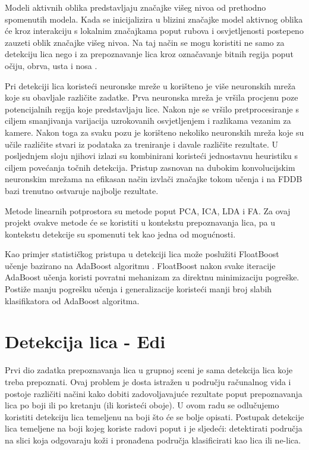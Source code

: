 \documentclass[times, utf8, seminar, numeric]{fer}
\begin{document}
Modeli aktivnih oblika predstavljaju značajke višeg nivoa od prethodno spomenutih modela. Kada se inicijalizira u blizini značajke model aktivnog oblika će kroz interakciju s lokalnim značajkama poput rubova i osvjetljenosti postepeno zauzeti oblik značajke višeg nivoa. Na taj način se mogu koristiti ne samo za detekciju lica nego i za prepoznavanje lica kroz označavanje bitnih regija poput očiju, obrva, usta i nosa \cite{prabhu_utsav_facialrecog}.

Pri detekciji lica koristeći neuronske mreže u \cite{Rowley98neuralnetwork-based} korišteno je više neuronskih mreža koje su obavljale različite zadatke. Prva neuronska mreža je vršila procjenu poze potencijalnih regija koje predstavljaju lice. Nakon nje se vršilo pretprocesiranje s ciljem smanjivanja varijacija uzrokovanih osvjetljenjem i razlikama vezanim za kamere. Nakon toga za svaku pozu je korišteno nekoliko neuronskih mreža koje su učile različite stvari iz podataka za treniranje i davale različite rezultate. U posljednjem sloju njihovi izlazi su kombinirani koristeći jednostavnu heuristiku s ciljem povećanja točnih detekcija. Pristup zasnovan na dubokim konvolucijskim neuronskim mrežama \cite{zhang2014improving} na efikasan način izvlači značajke tokom učenja i na FDDB bazi trenutno ostvaruje najbolje rezultate. 

Metode linearnih potprostora su metode poput PCA, ICA, LDA i FA. Za ovaj projekt ovakve metode će se koristiti u kontekstu prepoznavanja lica, pa u kontekstu detekcije su spomenuti tek kao jedna od mogućnosti.

Kao primjer statističkog pristupa u detekciji lica može poslužiti FloatBoost učenje bazirano na AdaBoost algoritmu \cite{Li04floatboostlearning}. FloatBoost nakon svake iteracije AdaBoost učenja koristi povratni mehanizam za direktnu minimizaciju pogreške. Postiže manju pogrešku učenja i generalizacije koristeći manji broj slabih klasifikatora od AdaBoost algoritma.

\section{Detekcija lica - Edi}

Prvi dio zadatka prepoznavanja lica u grupnoj sceni je sama detekcija lica koje treba prepoznati. Ovaj problem je dosta istražen u području računalnog vida i postoje različiti načini kako dobiti zadovoljavajuće rezultate poput prepoznavanja lica po boji ili po kretanju (ili koristeći oboje). U ovom radu se odlučujemo koristiti detekciju lica temeljenu na boji što će se bolje opisati.
Postupak detekcije lica temeljene na boji kojeg koriste radovi poput \cite{Senior:2002:FDC:513073.513082} i \cite{conf/isda/ChandrappaR12} je sljedeći: detektirati područja na slici koja odgovaraju koži i pronađena područja klasificirati kao lica ili ne-lica. 
\end{document}
